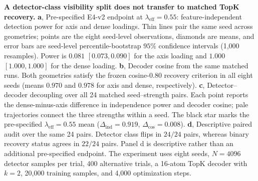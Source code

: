 \caption{\textbf{A detector-class visibility split does not transfer to matched TopK recovery.}
\textbf{a}, Pre-specified E4-v2 endpoint at $\lambda_{\mathrm{eff}}=0.55$: feature-independent detection power for axis and dense loadings. Thin lines pair the same seed across geometries; points are the eight seed-level observations, diamonds are means, and error bars are seed-level percentile-bootstrap $95\%$ confidence intervals (1,000 resamples). Power is $0.081$ $[0.073,0.090]$ for the axis loading and $1.000$ $[1.000,1.000]$ for the dense loading.
\textbf{b}, Decoder cosine from the same matched runs. Both geometries satisfy the frozen cosine-$0.80$ recovery criterion in all eight seeds (means $0.970$ and $0.978$ for axis and dense, respectively).
\textbf{c}, Detector--decoder decoupling over all 24 matched seed--strength pairs. Each point reports the dense-minus-axis difference in independence power and decoder cosine; pale trajectories connect the three strengths within a seed. The black star marks the pre-specified $\lambda_{\mathrm{eff}}=0.55$ mean ($\Delta_{\mathrm{ind}}=0.919$, $\Delta_{\mathrm{cos}}=0.008$).
\textbf{d}, Descriptive paired audit over the same 24 pairs. Detector class flips in $24/24$ pairs, whereas binary recovery status agrees in $22/24$ pairs. Panel d is descriptive rather than an additional pre-specified endpoint. The experiment uses eight seeds, $N=4096$ detector samples per trial, 400 alternative trials, a 16-atom TopK decoder with $k=2$, 20,000 training samples, and 4,000 optimization steps.}
\label{fig:detector_decoder_decoupling}
